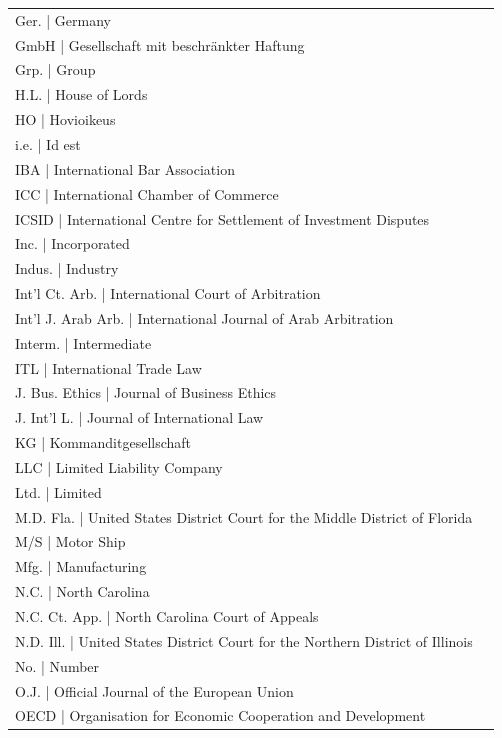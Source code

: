 \begin{longtable}[l]{p{1.3in}p{5.1in}}
Ger.        | Germany \\
GmbH        | Gesellschaft mit beschr\"{a}nkter Haftung \\
Grp.        | Group \\
H.L.        | House of Lords\\
HO          | Hovioikeus \\
i.e.        | Id est\\
IBA         | International Bar Association \\
ICC         | International Chamber of Commerce \\
ICSID       | International Centre for Settlement of Investment Disputes \\
Inc.        | Incorporated \\
Indus.      | Industry \\
Int'l Ct. Arb. | International Court of Arbitration \\
Int'l J. Arab Arb. | International Journal of Arab Arbitration \\
Interm.     | Intermediate \\
ITL         | International Trade Law \\
J. Bus. Ethics          | Journal of Business Ethics \\
J. Int'l L. | Journal of International Law \\
KG          | Kommanditgesellschaft\\
LLC         | Limited Liability Company \\
Ltd.        | Limited \\
M.D. Fla.   | United States District Court for the Middle District of Florida \\
M/S         | Motor Ship\\
Mfg.        | Manufacturing \\
N.C.        | North Carolina \\
N.C. Ct. App. | North Carolina Court of Appeals\\
N.D. Ill.   | United States District Court for the Northern District of Illinois \\
No.         | Number \\
O.J.        | Official Journal of the European Union\\
OECD        | Organisation for Economic Cooperation and Development \\

\end{longtable}
